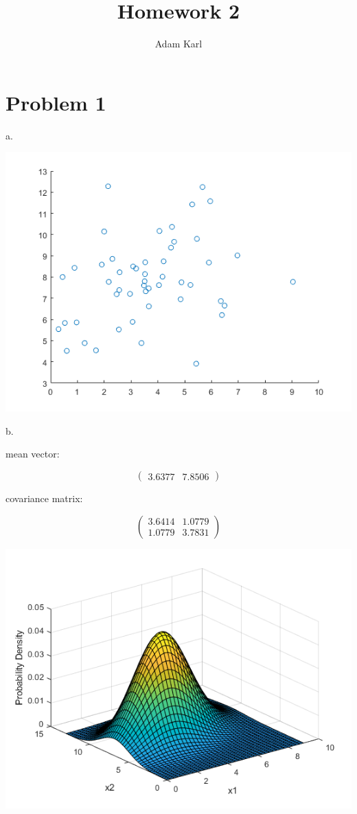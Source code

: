\documentclass[a4paper]{article}
\title{Homework 2}
\author{Adam Karl}
\begin{document}
\maketitle

\section{Problem 1}
a.

\begin{center}
    \includegraphics[scale=1]{1a.png}
\end{center}

b. 

mean vector: 

$$\left( \begin{matrix} 3.6377 & 7.8506 \end{matrix} \right) $$

covariance matrix:


$$\left( \begin{matrix} 3.6414 & 1.0779 \\ 1.0779 & 3.7831 \end{matrix} \right) $$

\begin{center}
    \includegraphics[scale=1]{1b.png}
\end{center}
\end{document}
